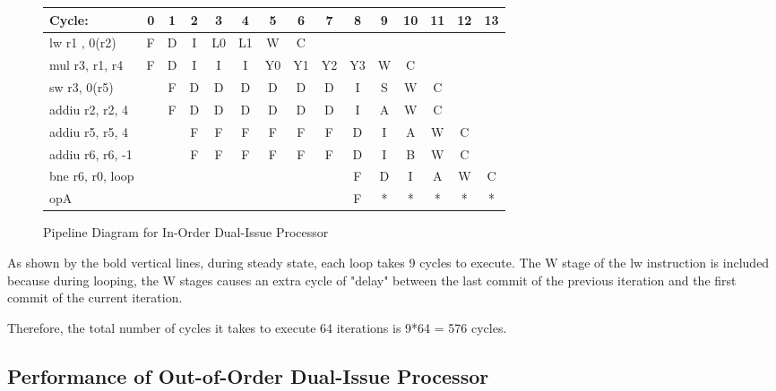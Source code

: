 \documentclass[10pt]{article}
\begin{document}
\begin{figure}[H]
\centering
{\setlength{\tabcolsep}{2pt}
\begin{tabular}{|l|c|c|c|c|c!{\vrule width 1.5pt}c|c|c|c|c|c|c|c|c!{\vrule width 1.5pt}}
\hline
Cycle:            & 0  & 1  & 2  & 3  & 4  & 5  & 6  & 7  & 8  & 9  & 10 & 11 & 12 & 13 \\ \hline
lw r1 , 0(r2)     & F  & D  & I  & L0 & L1 & W  & C  &    &    &    &    &    &    &    \\ \hline
mul r3, r1, r4    & F  & D  & I  & I  & I  & Y0 & Y1 & Y2 & Y3 & W  & C  &    &    &    \\ \hline
sw r3, 0(r5)      &    & F  & D  & D  & D  & D  & D  & D  & I  & S  & W  & C  &    &    \\ \hline
addiu r2, r2, 4   &    & F  & D  & D  & D  & D  & D  & D  & I  & A  & W  & C  &    &    \\ \hline
addiu r5, r5, 4   &    &    & F  & F  & F  & F  & F  & F  & D  & I  & A  & W  & C  &    \\ \hline
addiu r6, r6, -1  &    &    & F  & F  & F  & F  & F  & F  & D  & I  & B  & W  & C  &    \\ \hline
bne r6, r0, loop  &    &    &    &    &    &    &    &    & F  & D  & I  & A  & W  & C  \\ \hline
opA               &    &    &    &    &    &    &    &    & F  & *  & *  & *  & *  & *  \\ \hline
\end{tabular}
}
\caption{Pipeline Diagram for In-Order Dual-Issue Processor}
\end{figure}
As shown by the bold vertical lines, during steady state, each loop takes 9 cycles to execute. The W stage of the lw instruction is included because during looping, the W stages causes an extra cycle of "delay" between the last commit of the previous iteration and the first commit of the current iteration.

Therefore, the total number of cycles it takes to execute 64 iterations is 9*64 = 576 cycles.

\subsection{Performance of Out-of-Order Dual-Issue Processor}
\end{document}
